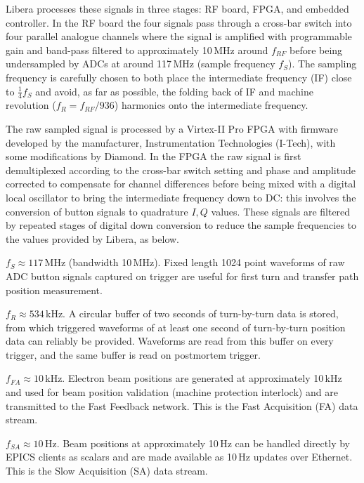 \documentclass{JAC2003}
\begin{document}
Libera processes these signals in three stages: RF board, FPGA, and embedded
controller.  In the RF board the four signals pass through a cross-bar switch
into four parallel analogue channels where the signal is amplified with
programmable gain and band-pass filtered to approximately 10\,MHz around
$f_{RF}$ before being undersampled by ADCs at around 117\,MHz (sample
frequency $f_S$).  The sampling frequency is carefully chosen to both place
the intermediate frequency (IF) close to $\frac14 f_S$ and avoid, as far as
possible, the folding back of IF and machine revolution ($f_{R} = f_{RF}/936$)
harmonics onto the intermediate frequency.

The raw sampled signal is processed by a Virtex-II Pro FPGA with firmware
developed by the manufacturer, Instrumentation Technologies (I-Tech), with
some modifications by Diamond.  In the FPGA the raw signal is first
demultiplexed according to the cross-bar switch setting and phase and
amplitude corrected to compensate for channel differences before being mixed
with a digital local oscillator to bring the intermediate frequency down to
DC: this involves the conversion of button signals to quadrature $I,Q$ values.
These signals are filtered by repeated stages of digital down conversion to
reduce the sample frequencies to the values provided by Libera, as below.

\begin{description*}
\renewcommand{\makelabel}{}     %
\item
    $f_S \approx 117$\,MHz (bandwidth 10\,MHz).  Fixed length 1024 point
    waveforms of raw ADC button signals captured on trigger are useful for
    first turn and transfer path position measurement.
\item
    $f_R \approx 534$\,kHz.  A circular buffer of two seconds of turn-by-turn
    data is stored, from which triggered waveforms of at least one second of
    turn-by-turn position data can reliably be provided.  Waveforms are read
    from this buffer on every trigger, and the same buffer is read on
    postmortem trigger.
\item
    $f_{FA} \approx 10$\,kHz.  Electron beam positions are generated at
    approximately 10\,kHz and used for beam position validation (machine
    protection interlock) and are transmitted to the Fast Feedback
    network\cite{fast-feedback}.  This is the Fast Acquisition (FA) data
    stream.
\item
    $f_{SA} \approx 10$\,Hz.  Beam positions at approximately 10\,Hz can be
    handled directly by EPICS clients as scalars and are made available as
    10\,Hz updates over Ethernet.  This is the Slow Acquisition (SA) data
    stream.
\end{description*}
\end{document}
